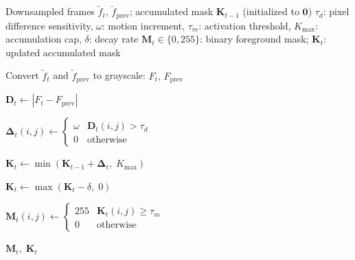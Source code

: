 \documentclass{article}
\begin{document}
\begin{preview}

\setcounter{algorithm}{3} %

\begin{algorithm}[H]
\caption{Accumulation Motion Detector (AccMotionDet)}
\label{alg:acc_motion_det}
\begin{algorithmic}[1]

\Require Downsampled frames $\tilde{f}_t,\, \tilde{f}_{\text{prev}}$;
         accumulated mask $\mathbf{K}_{t-1}$ (initialized to $\mathbf{0}$)
\Require $\tau_d$: pixel difference sensitivity,\;
         $\omega$: motion increment,\;
         $\tau_m$: activation threshold,\;
         $K_{\max}$: accumulation cap,\;
         $\delta$: decay rate
\Ensure $\mathbf{M}_t \in \{0, 255\}$: binary foreground mask;\;
        $\mathbf{K}_t$: updated accumulated mask

\Statex

\State Convert $\tilde{f}_t$ and $\tilde{f}_{\text{prev}}$ to grayscale: $F_t,\, F_{\text{prev}}$

\Statex

\State $\mathbf{D}_t \leftarrow \left| F_t - F_{\text{prev}} \right|$

\State $\symbf{\Delta}_t(i,j) \leftarrow
\begin{cases}
\omega & \mathbf{D}_t(i,j) > \tau_d \\
0      & \text{otherwise}
\end{cases}$

\Statex

\State $\mathbf{K}_t \leftarrow \min\!\left(\mathbf{K}_{t-1} + \symbf{\Delta}_t,\; K_{\max}\right)$

\State $\mathbf{K}_t \leftarrow \max\!\left(\mathbf{K}_t - \delta,\; 0\right)$

\Statex

\State $\mathbf{M}_t(i,j) \leftarrow
\begin{cases}
255 & \mathbf{K}_t(i,j) \geq \tau_m \\
0   & \text{otherwise}
\end{cases}$

\State \Return $\mathbf{M}_t,\; \mathbf{K}_t$

\end{algorithmic}
\end{algorithm}


\end{preview}
\end{document}
